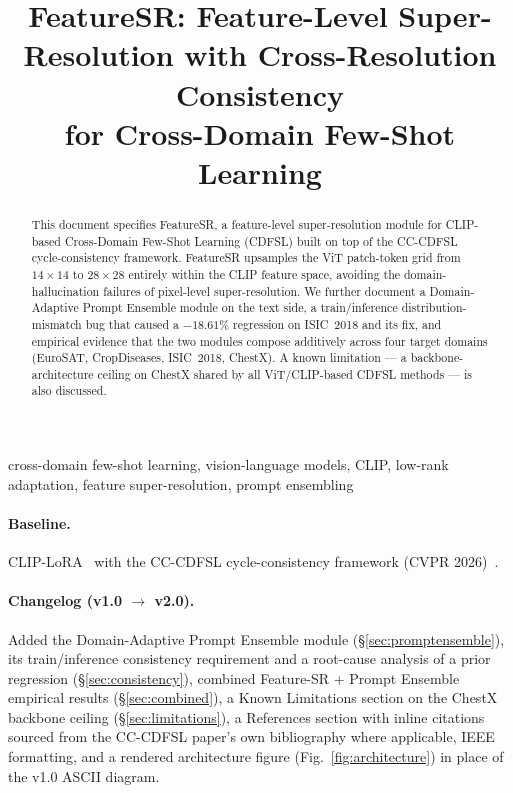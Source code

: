 \documentclass[conference]{IEEEtran}
\title{FeatureSR: Feature-Level Super-Resolution with Cross-Resolution Consistency\\ for Cross-Domain Few-Shot Learning}
\author{
\IEEEauthorblockN{FeatureSR Project --- Technical Methodology Document}
\IEEEauthorblockA{Version 2.0 \quad $\bullet$ \quad 2026-08-31}
}
\begin{document}
\maketitle

\begin{abstract}
This document specifies FeatureSR, a feature-level super-resolution module for CLIP-based Cross-Domain Few-Shot Learning (CDFSL) built on top of the CC-CDFSL cycle-consistency framework. FeatureSR upsamples the ViT patch-token grid from $14{\times}14$ to $28{\times}28$ entirely within the CLIP feature space, avoiding the domain-hallucination failures of pixel-level super-resolution. We further document a Domain-Adaptive Prompt Ensemble module on the text side, a train/inference distribution-mismatch bug that caused a $-18.61\%$ regression on ISIC~2018 and its fix, and empirical evidence that the two modules compose additively across four target domains (EuroSAT, CropDiseases, ISIC~2018, ChestX). A known limitation --- a backbone-architecture ceiling on ChestX shared by all ViT/CLIP-based CDFSL methods --- is also discussed.
\end{abstract}

\begin{IEEEkeywords}
cross-domain few-shot learning, vision-language models, CLIP, low-rank adaptation, feature super-resolution, prompt ensembling
\end{IEEEkeywords}

\paragraph{Baseline.} CLIP-LoRA~\cite{zanella2024cliplora} with the CC-CDFSL cycle-consistency framework (CVPR 2026)~\cite{zhao2026ccdfsl}.

\paragraph{Changelog (v1.0 $\to$ v2.0).} Added the Domain-Adaptive Prompt Ensemble module (\S\ref{sec:promptensemble}), its train/inference consistency requirement and a root-cause analysis of a prior regression (\S\ref{sec:consistency}), combined Feature-SR + Prompt Ensemble empirical results (\S\ref{sec:combined}), a Known Limitations section on the ChestX backbone ceiling (\S\ref{sec:limitations}), a References section with inline citations sourced from the CC-CDFSL paper's own bibliography where applicable, IEEE formatting, and a rendered architecture figure (Fig.~\ref{fig:architecture}) in place of the v1.0 ASCII diagram.
\end{document}
